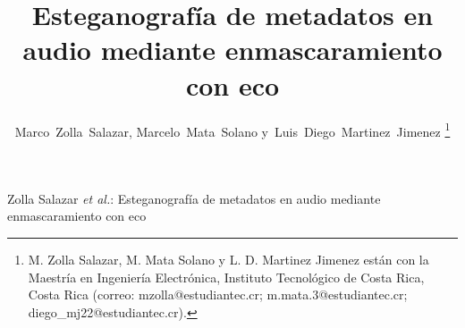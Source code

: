 \documentclass[letterpaper,journal]{IEEEtran}
\begin{document}
\title{Esteganografía de metadatos en audio mediante enmascaramiento con eco}

\author{%
  Marco~Zolla~Salazar,
  Marcelo~Mata~Solano
  y~Luis~Diego~Martinez~Jimenez%
  \thanks{M. Zolla Salazar, M. Mata Solano y L. D. Martinez Jimenez están con la
  Maestría en Ingeniería Electrónica, Instituto Tecnológico de Costa Rica, Costa Rica
  (correo: mzolla@estudiantec.cr; m.mata.3@estudiantec.cr;
  diego\_mj22@estudiantec.cr).}}

%
{Zolla Salazar \MakeLowercase{\textit{et al.}}: Esteganografía de metadatos en audio mediante enmascaramiento con eco}

\maketitle
\end{document}
